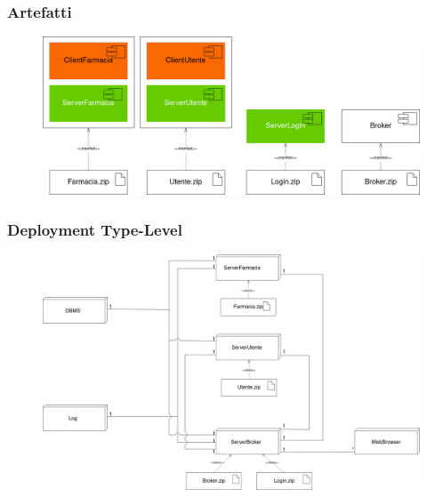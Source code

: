 \subsubsection{Artefatti}

\begin{figure}[h!]
    \begin{center}
        \includegraphics[width=\textwidth]{immagini/Deployment-Artefatti.jpg}
    \end{center}
\end{figure}

\subsubsection{Deployment Type-Level}

\begin{figure}[h!]
    \begin{center}
        \includegraphics[width=\textwidth]{immagini/Deployment-TypeLevel.jpg}
    \end{center}
\end{figure}